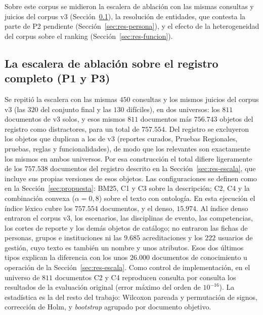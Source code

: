 \documentclass[11pt,letterpaper]{article}
\numberwithin{equation}{section}
\begin{document}
Sobre este corpus se midieron la escalera de ablación con las mismas consultas y juicios del corpus v3 (Sección~\ref{sec:res-escalera}), la resolución de entidades, que contesta la parte de P2 pendiente (Sección~\ref{sec:res-persona}), y el efecto de la heterogeneidad del corpus sobre el ranking (Sección~\ref{sec:res-funcion}).

\subsection{La escalera de ablación sobre el registro completo (P1 y P3)}
\label{sec:res-escalera}
Se repitió la escalera con las mismas $450$ consultas y los mismos juicios del corpus v3 (las $320$ del conjunto final y las $130$ difíciles), en dos universos: los $811$ documentos de v3 solos, y esos mismos $811$ documentos más $756.743$ objetos del registro como distractores, para un total de $757.554$. Del registro se excluyeron los objetos que duplican a los de v3 (reportes curados, Pruebas Regionales, pruebas, reglas y funcionalidades), de modo que los relevantes son exactamente los mismos en ambos universos. Por esa construcción el total difiere ligeramente de los $757.538$ documentos del registro descrito en la Sección~\ref{sec:res-escala}, que incluye sus propias versiones de esos objetos. Las configuraciones se definen como en la Sección~\ref{sec:propuesta}: BM25, C1 y C3 sobre la descripción; C2, C4 y la combinación convexa ($\alpha=0{,}8$) sobre el texto con ontología. En esta ejecución el índice léxico cubre los $757.554$ documentos, y el denso, $15.974$. Al índice denso entraron el corpus v3, los escenarios, las disciplinas de evento, las competencias, los cortes de reporte y los demás objetos de catálogo; no entraron las fichas de personas, grupos e instituciones ni las $9.685$ acreditaciones y los $222$ usuarios de gestión, cuyo texto es también un nombre y unos atributos. Esos dos últimos tipos explican la diferencia con los unos $26.000$ documentos de conocimiento u operación de la Sección~\ref{sec:res-escala}. Como control de implementación, en el universo de $811$ documentos C2 y C4 reproducen consulta por consulta los resultados de la evaluación original (error máximo del orden de $10^{-16}$). La estadística es la del resto del trabajo: Wilcoxon pareada y permutación de signos, corrección de Holm, y \textit{bootstrap} agrupado por documento objetivo.
\end{document}
